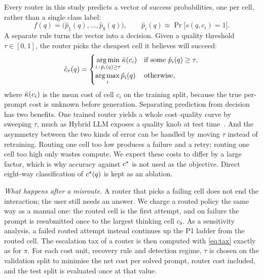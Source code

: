 Every router in this study predicts a vector of success probabilities, one
per cell, rather than a single class label:
\begin{equation}
  f(q) = \bigl(\hat{p}_1(q), \dots, \hat{p}_8(q)\bigr), \qquad
  \hat{p}_i(q) \approx \Pr\bigl[s(q, c_i) = 1\bigr].
  \label{eq:router}
\end{equation}
A separate rule turns the vector into a decision. Given a quality threshold
$\tau \in [0, 1]$, the router picks the cheapest cell it believes will
succeed:
\begin{equation}
  \hat{c}_\tau(q) =
  \begin{cases}
    \displaystyle\operatorname*{arg\,min}_{i \,:\, \hat{p}_i(q) \geq \tau} \bar{\kappa}(c_i)
      & \text{if some } \hat{p}_i(q) \geq \tau,\\[1.2ex]
    \displaystyle\operatorname*{arg\,max}_{i} \hat{p}_i(q) & \text{otherwise},
  \end{cases}
  \label{eq:selection}
\end{equation}
where $\bar{\kappa}(c_i)$ is the mean cost of cell $c_i$ on the training
split, because the true per-prompt cost is unknown before generation.
Separating prediction from decision has two benefits. One trained router
yields a whole cost--quality curve by sweeping $\tau$, much as Hybrid LLM
exposes a quality knob at test time~\cite{ding2024hybridllm}. And the
asymmetry between the two kinds of error can be handled by moving $\tau$
instead of retraining. Routing one cell too low produces a failure and a
retry; routing one cell too high only wastes compute. We expect these costs
to differ by a large factor, which is why accuracy against $c^{\star}$ is not
used as the objective. Direct eight-way classification of $c^{\star}(q)$ is
kept as an ablation.

\emph{What happens after a misroute.} A router that picks a failing cell
does not end the interaction; the user still needs an answer. We charge a
routed policy the same way as a manual one: the routed cell is the first
attempt, and on failure the prompt is resubmitted once to the largest
thinking cell $c_8$. As a sensitivity analysis, a failed routed attempt
instead continues up the P1 ladder from the routed cell. The escalation tax
of a router is then computed with \eqref{eq:tax} exactly as for $\pi$. For
each cost unit, recovery rule and detection regime, $\tau$ is chosen on the
validation split to minimise the net cost per solved prompt, router cost
included, and the test split is evaluated once at that value.

